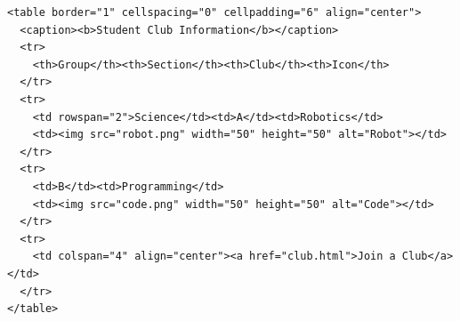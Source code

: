 \par{}\par\smallskip
\begin{verbatim}
<table border="1" cellspacing="0" cellpadding="6" align="center">
  <caption><b>Student Club Information</b></caption>
  <tr>
    <th>Group</th><th>Section</th><th>Club</th><th>Icon</th>
  </tr>
  <tr>
    <td rowspan="2">Science</td><td>A</td><td>Robotics</td>
    <td><img src="robot.png" width="50" height="50" alt="Robot"></td>
  </tr>
  <tr>
    <td>B</td><td>Programming</td>
    <td><img src="code.png" width="50" height="50" alt="Code"></td>
  </tr>
  <tr>
    <td colspan="4" align="center"><a href="club.html">Join a Club</a></td>
  </tr>
</table>
\end{verbatim}
\smallskip





